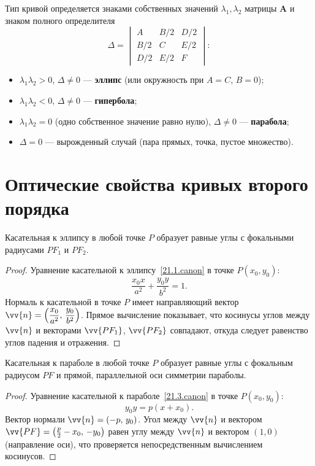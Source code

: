 Тип кривой определяется знаками собственных значений $\lambda_1, \lambda_2$ матрицы $\mathbf{A}$ и знаком полного определителя
\begin{equation}
  \Delta = \begin{vmatrix} A & B/2 & D/2 \\ B/2 & C & E/2 \\ D/2 & E/2 & F \end{vmatrix}\!:
\end{equation}
\begin{itemize}
  \item $\lambda_1 \lambda_2 > 0$, $\Delta \neq 0$ --- \textbf{эллипс} (или окружность при $A=C$, $B=0$);
  \item $\lambda_1 \lambda_2 < 0$, $\Delta \neq 0$ --- \textbf{гипербола};
  \item $\lambda_1 \lambda_2 = 0$ (одно собственное значение равно нулю), $\Delta \neq 0$ --- \textbf{парабола};
  \item $\Delta = 0$ --- вырожденный случай (пара прямых, точка, пустое множество).
\end{itemize}

\section{Оптические свойства кривых второго порядка}

\begin{thm}
Касательная к эллипсу в любой точке $P$ образует равные углы с фокальными радиусами $PF_1$ и $PF_2$.
\end{thm}

\begin{proof}
Уравнение касательной к эллипсу~\eqref{21.1.canon} в точке $P(x_0, y_0)$:
\begin{equation}\label{21.5.tang_ell}
  \frac{x_0 x}{a^2} + \frac{y_0 y}{b^2} = 1.
\end{equation}
Нормаль к касательной в точке $P$ имеет направляющий вектор $\vv{n} = \left(\dfrac{x_0}{a^2},\, \dfrac{y_0}{b^2}\right)$. Прямое вычисление показывает, что косинусы углов между $\vv{n}$ и векторами $\vv{PF_1}$, $\vv{PF_2}$ совпадают, откуда следует равенство углов падения и отражения.
\end{proof}

\begin{thm}
Касательная к параболе в любой точке $P$ образует равные углы с фокальным радиусом $PF$ и прямой, параллельной оси симметрии параболы.
\end{thm}

\begin{proof}
Уравнение касательной к параболе~\eqref{21.3.canon} в точке $P(x_0, y_0)$:
\begin{equation}\label{21.5.tang_par}
  y_0 y = p(x + x_0).
\end{equation}
Вектор нормали $\vv{n} = (-p,\, y_0)$. Угол между $\vv{n}$ и вектором $\vv{PF} = \left(\tfrac{p}{2}-x_0,\,-y_0\right)$ равен углу между $\vv{n}$ и вектором $(1, 0)$ (направление оси), что проверяется непосредственным вычислением косинусов.
\end{proof}